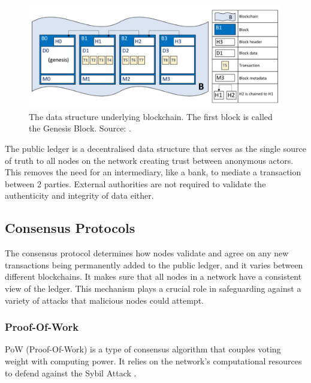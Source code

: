 \begin{figure}[h]
    \centering
    \includegraphics[width=13cm,center]{Figures/BlockchainStructure.png}
    \caption{The data structure underlying blockchain. The first block is called the Genesis Block. Source: \cite{ADocumentation}.}
    \label{Figure:BasicBlockchain}
\end{figure}

The public ledger is a decentralised data structure that serves as the single source of truth to all nodes on the network creating trust between anonymous actors. This removes the need for an intermediary, like a bank, to mediate a transaction between 2 parties. External authorities are not required to validate the authenticity and integrity of data either.




\subsection{Consensus Protocols}

The consensus protocol determines how nodes validate and agree on any new transactions being permanently added to the public ledger, and it varies between different blockchains. It makes sure that all nodes in a network have a consistent view of the ledger. This mechanism plays a crucial role in safeguarding against a variety of attacks that malicious nodes could attempt.

\subsubsection{Proof-Of-Work}

PoW (Proof-Of-Work) is a type of consensus algorithm that couples voting weight with computing 
power. It relies on the network's computational resources to defend against the Sybil Attack \cite{Sedlmeir2020TheMyth}.

